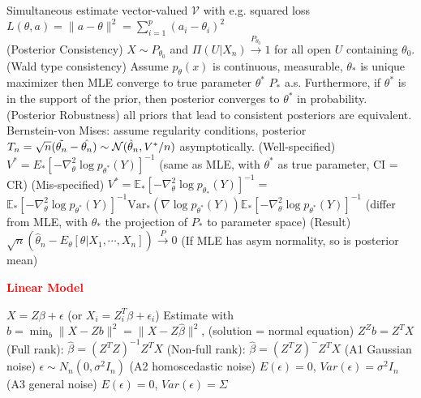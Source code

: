 \documentclass{article}
\renewcommand{\section}[1]{\textcolor{red}{\textbf{#1}}}
\renewcommand{\subsection}[1]{\text{\hl{[#1]}}}
\newcommand{\compact}{\\}
\begin{document}
\subsection{Simul est}
Simultaneous estimate vector-valued $\mathcal{V}$ with e.g. squared loss
$L(\theta, a) = \|a - \theta\|^2 = \sum_{i=1}^{p} (a_i - \theta_i)^2$
\compact
\subsection{Asymptotic}
(Posterior Consistency)
$X\sim P_{\theta_0}$ and $\Pi(U|X_n) \xrightarrow{P_{\theta_0}} 1$
for all open $U$ containing $\theta_0$.
(Wald type consistency)
Assume $p_\theta(x)$ is continuous, measurable, $\theta_*$ is unique maximizer
then MLE converge to true parameter $\theta^*$ $P_*$ a.s.
Furthermore, if $\theta^\ast$ is in the support of the prior,
then posterior converges to $\theta^\ast$ in probability.
(Posterior Robustness)
all priors that lead to consistent posteriors are equivalent.
\compact
\subsection{BM}
Bernstein-von Mises: assume regularity conditions, posterior
$T_n = \sqrt{n} (\Tilde{\theta_n}-\hat{\theta_n}) \sim \mathcal{N}(\hat\theta_n, V^*/n)$
asymptotically.
(Well-specified)
$V^* = E_* \left[ -\nabla_\theta^2 \log p_{\theta^*}(Y) \right]^{-1}$
(same as MLE, with $\theta^*$ as true parameter, CI = CR)
(Mis-specified)
$V^* = \mathbb{E}_*\left[-\nabla_\theta^2\log p_{\theta_*}(Y)\right]^{-1}=$
$\mathbb{E}_*\left[-\nabla_\theta^2\log p_{\theta^*}(Y)\right]^{-1}\text{Var}_*\left(\nabla\log
    p_{\theta^*}(Y)\right)\mathbb{E}_*\left[-\nabla_\theta^2\log p_{\theta^*}(Y)\right]^{-1}$
(differ from MLE, with $\theta_*$ the projection of $P_*$ to parameter
space)
(Result)
$\sqrt{n} \left( \hat\theta_n - E_\theta[\theta | X_1, \cdots, X_n] \right)
    \xrightarrow{P} 0$ (If MLE has asym normality, so is posterior mean)

\section{Linear Model}

\subsection{Linear Model}
$X = Z\beta + \epsilon$ (or $X_i = Z_i^T \beta + \epsilon_i$)
Estimate with $b = \min_b \lVert X - Zb \rVert^2 = \lVert X - Z\hat\beta
    \rVert^2$,
(solution = normal equation) $Z^Z b = Z^T X$
(Full rank): $\hat\beta = (Z^T Z)^{-1}Z^T X$
(Non-full rank): $\hat\beta = (Z^T Z)^{-}Z^T X$
(A1 Gaussian noise) $\epsilon \sim N_n(0, \sigma^2 I_n)$
(A2 homoscedastic noise) $E(\epsilon) = 0$, $Var(\epsilon) = \sigma^2 I_n$
(A3 general noise) $E(\epsilon) = 0$, $Var(\epsilon) = \Sigma$
\compact
\end{document}
